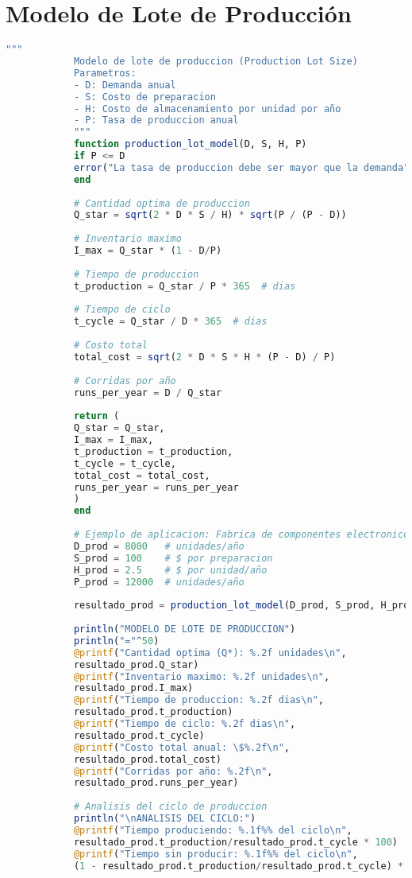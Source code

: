 \documentclass[12pt,a4paper]{book}
\begin{document}
	\section{Modelo de Lote de Producci\'on}
	
	\begin{tcolorbox}[enhanced,colback=verdeclaro,colframe=verdeprincipal,boxrule=3pt,arc=12pt,
		drop shadow,title={\Large\bfseries\color{white} \faCogs\ MODELO DE PRODUCCI\'ON},breakable]
		
		\begin{lstlisting}[language=Julia,basicstyle=\scriptsize\ttfamily]
			"""
			Modelo de lote de produccion (Production Lot Size)
			Parametros:
			- D: Demanda anual
			- S: Costo de preparacion
			- H: Costo de almacenamiento por unidad por año
			- P: Tasa de produccion anual
			"""
			function production_lot_model(D, S, H, P)
			if P <= D
			error("La tasa de produccion debe ser mayor que la demanda")
			end
			
			# Cantidad optima de produccion
			Q_star = sqrt(2 * D * S / H) * sqrt(P / (P - D))
			
			# Inventario maximo
			I_max = Q_star * (1 - D/P)
			
			# Tiempo de produccion
			t_production = Q_star / P * 365  # dias
			
			# Tiempo de ciclo
			t_cycle = Q_star / D * 365  # dias
			
			# Costo total
			total_cost = sqrt(2 * D * S * H * (P - D) / P)
			
			# Corridas por año
			runs_per_year = D / Q_star
			
			return (
			Q_star = Q_star,
			I_max = I_max,
			t_production = t_production,
			t_cycle = t_cycle,
			total_cost = total_cost,
			runs_per_year = runs_per_year
			)
			end
			
			# Ejemplo de aplicacion: Fabrica de componentes electronicos
			D_prod = 8000   # unidades/año
			S_prod = 100    # $ por preparacion
			H_prod = 2.5    # $ por unidad/año
			P_prod = 12000  # unidades/año
			
			resultado_prod = production_lot_model(D_prod, S_prod, H_prod, P_prod)
			
			println("MODELO DE LOTE DE PRODUCCION")
			println("="^50)
			@printf("Cantidad optima (Q*): %.2f unidades\n", 
			resultado_prod.Q_star)
			@printf("Inventario maximo: %.2f unidades\n", 
			resultado_prod.I_max)
			@printf("Tiempo de produccion: %.2f dias\n", 
			resultado_prod.t_production)
			@printf("Tiempo de ciclo: %.2f dias\n", 
			resultado_prod.t_cycle)
			@printf("Costo total anual: \$%.2f\n", 
			resultado_prod.total_cost)
			@printf("Corridas por año: %.2f\n", 
			resultado_prod.runs_per_year)
			
			# Analisis del ciclo de produccion
			println("\nANALISIS DEL CICLO:")
			@printf("Tiempo produciendo: %.1f%% del ciclo\n", 
			resultado_prod.t_production/resultado_prod.t_cycle * 100)
			@printf("Tiempo sin producir: %.1f%% del ciclo\n", 
			(1 - resultado_prod.t_production/resultado_prod.t_cycle) * 100)
		\end{lstlisting}
		
	\end{tcolorbox}
	
\end{document}
